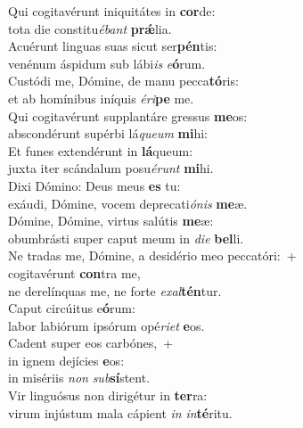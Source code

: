 \evenverse Qui cogitavérunt iniquitátes in \textbf{cor}de:~\*\\
\evenverse tota die constitu\textit{é}\textit{bant} \textbf{prǽ}lia.\\
\oddverse Acuérunt linguas suas sicut ser\textbf{pén}tis:~\*\\
\oddverse venénum áspidum sub lábi\textit{is} \textit{e}\textbf{ó}rum.\\
\evenverse Custódi me, Dómine, de manu pecca\textbf{tó}ris:~\*\\
\evenverse et ab homínibus iníquis \textit{é}\textit{ri}\textbf{pe} me.\\
\oddverse Qui cogitavérunt supplantáre gressus \textbf{me}os:~\*\\
\oddverse abscondérunt supérbi lá\textit{que}\textit{um} \textbf{mi}hi:\\
\evenverse Et funes extendérunt in \textbf{lá}queum:~\*\\
\evenverse juxta iter scándalum posu\textit{é}\textit{runt} \textbf{mi}hi.\\
\oddverse Dixi Dómino: Deus meus \textbf{es} tu:~\*\\
\oddverse exáudi, Dómine, vocem deprecati\textit{ó}\textit{nis} \textbf{me}æ.\\
\evenverse Dómine, Dómine, virtus salútis \textbf{me}æ:~\*\\
\evenverse obumbrásti super caput meum in \textit{di}\textit{e} \textbf{bel}li.\\
\oddverse Ne tradas me, Dómine, a desidério meo peccatóri:~+\\
\oddverse  cogitavérunt \textbf{con}tra me,~\*\\
\oddverse ne derelínquas me, ne forte \textit{e}\textit{xal}\textbf{tén}tur.\\
\evenverse Caput circúitus e\textbf{ó}rum:~\*\\
\evenverse labor labiórum ipsórum opé\textit{ri}\textit{et} \textbf{e}os.\\
\oddverse Cadent super eos carbónes,~+\\
\oddverse  in ignem dejícies \textbf{e}os:~\*\\
\oddverse in misériis \textit{non} \textit{sub}\textbf{sí}stent.\\
\evenverse Vir linguósus non dirigétur in \textbf{ter}ra:~\*\\
\evenverse virum injústum mala cápient \textit{in} \textit{in}\textbf{té}ritu.\\
